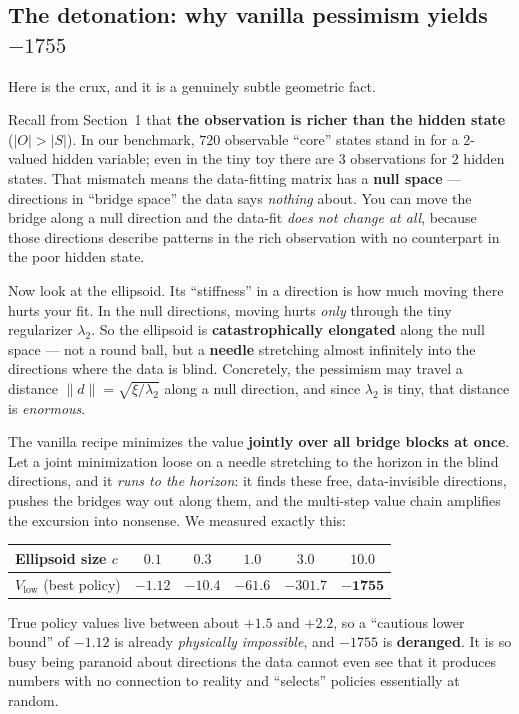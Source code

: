 \documentclass[11pt]{article}
\begin{document}
\subsection{The detonation: why vanilla pessimism yields $-1755$}
Here is the crux, and it is a genuinely subtle geometric fact.

Recall from Section~1 that \textbf{the observation is richer than the hidden state}
($|O| > |S|$). In our benchmark, $720$ observable ``core'' states stand in for a
$2$-valued hidden variable; even in the tiny toy there are $3$ observations for $2$
hidden states. That mismatch means the data-fitting matrix has a \textbf{null space}
--- directions in ``bridge space'' the data says \emph{nothing} about. You can move
the bridge along a null direction and the data-fit \emph{does not change at all},
because those directions describe patterns in the rich observation with no
counterpart in the poor hidden state.

Now look at the ellipsoid. Its ``stiffness'' in a direction is how much moving there
hurts your fit. In the null directions, moving hurts \emph{only} through the tiny
regularizer $\lambda_2$. So the ellipsoid is \textbf{catastrophically elongated} along
the null space --- not a round ball, but a \textbf{needle} stretching almost
infinitely into the directions where the data is blind. Concretely, the pessimism may
travel a distance $\lVert d\rVert=\sqrt{\xi/\lambda_2}$ along a null direction, and
since $\lambda_2$ is tiny, that distance is \emph{enormous}.

The vanilla recipe minimizes the value \textbf{jointly over all bridge blocks at
once}. Let a joint minimization loose on a needle stretching to the horizon in the
blind directions, and it \emph{runs to the horizon}: it finds these free,
data-invisible directions, pushes the bridges way out along them, and the multi-step
value chain amplifies the excursion into nonsense. We measured exactly this:

\begin{center}\small
\begin{tabular}{@{}lccccc@{}}
\toprule
Ellipsoid size $c$ & $0.1$ & $0.3$ & $1.0$ & $3.0$ & $10.0$\\
\midrule
$V_{\text{low}}$ (best policy) & $-1.12$ & $-10.4$ & $-61.6$ & $-301.7$ & $\mathbf{-1755}$\\
\bottomrule
\end{tabular}
\end{center}

True policy values live between about $+1.5$ and $+2.2$, so a ``cautious lower
bound'' of $-1.12$ is already \emph{physically impossible}, and $-1755$ is
\textbf{deranged}. It is so busy being paranoid about directions the data cannot even
see that it produces numbers with no connection to reality and ``selects'' policies
essentially at random.
\end{document}
